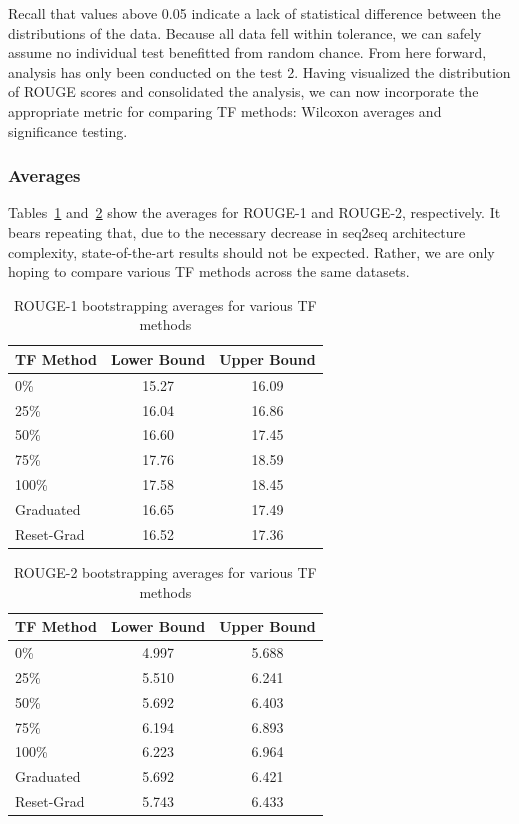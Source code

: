 Recall that values above 0.05 indicate a lack of statistical difference between the distributions of the data. Because all data fell within tolerance, we can safely assume no individual test benefitted from random chance. From here forward, analysis has only been conducted on the test 2. Having visualized the distribution of ROUGE scores and consolidated the analysis, we can now incorporate the appropriate metric for comparing TF methods: Wilcoxon averages and significance testing.

\subsubsection{Averages}\label{avg}
Tables~\ref{tab:avgROUGE1} and~\ref{tab:avgROUGE2} show the averages for ROUGE-1 and ROUGE-2, respectively. It bears repeating that, due to the necessary decrease in seq2seq architecture complexity, state-of-the-art results should not be expected. Rather, we are only hoping to compare various TF methods across the same datasets.

\begin{table}[h]
  \centering
  \begin{tabular}{| l | c | c |}
    \hline
    TF Method & Lower Bound & Upper Bound \\
    \hline
    0\% & 15.27  & 16.09 \\
    25\% & 16.04 & 16.86 \\
    50\% & 16.60 & 17.45 \\
    75\% & 17.76 & 18.59 \\
    100\% & 17.58 & 18.45 \\
    Graduated & 16.65 & 17.49 \\
    Reset-Grad & 16.52 & 17.36 \\
    \hline
  \end{tabular}
  \caption{ROUGE-1 bootstrapping averages for various TF methods}
  \label{tab:avgROUGE1}
\end{table}

\begin{table}[h]
  \centering
  \begin{tabular}{| l | c | c |}
    \hline
    TF Method & Lower Bound & Upper Bound \\
    \hline
    0\% & 4.997 & 5.688 \\
    25\% & 5.510 & 6.241 \\
    50\% & 5.692  & 6.403  \\
    75\% & 6.194  & 6.893  \\
    100\% & 6.223  & 6.964  \\
    Graduated & 5.692 & 6.421  \\
    Reset-Grad & 5.743 & 6.433  \\
    \hline
  \end{tabular}
  \caption{ROUGE-2 bootstrapping averages for various TF methods}
  \label{tab:avgROUGE2}
\end{table}

